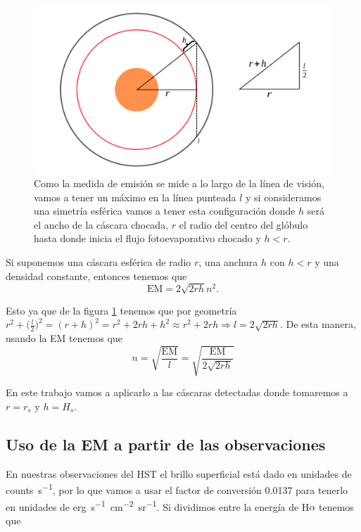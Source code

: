 \documentclass{book}
\begin{document}
\begin{figure}[htb]
    \centering    \includegraphics[width=\textwidth]{artesanales/ImgFi01-4.pdf}
    \caption{Como la medida de emisión se mide a lo largo de la línea de visión, vamos a tener un máximo en la línea punteada $l$ y si consideramos una simetría esférica vamos a tener esta configuración donde $h$ será el ancho de la cáscara chocada, $r$ el radio del centro del glóbulo hasta donde inicia el flujo fotoevaporativo chocado y $h<r$.}
    \label{fig:EM}
\end{figure}

Si suponemos una cáscara esférica de radio $r$, una anchura $h$ con  $h<r$ y una densidad constante, entonces tenemos que
\begin{equation}
\mathrm{EM}=2\sqrt{2rh}n^2.\end{equation}

Esto ya que de la figura \ref{fig:EM} tenemos que por geometría $r^2+\Big(\frac{l}{2}\Big)^2=(r+h)^2=r^2+2rh+h^2\approx r^2+2rh\Rightarrow l=2\sqrt{2rh}$. De esta manera, usando la EM tenemos que \begin{equation}n=\sqrt{\frac{\mathrm{EM}}{l}}=\sqrt{\frac{\mathrm{EM}}{2\sqrt{2rh}}}
\end{equation} 

En este trabajo vamos a aplicarlo a las cáscaras detectadas donde tomaremos a $r=r_s$ y $h=H_s$.

\subsection{Uso de la EM a partir de las observaciones} \label{Subsec : EM}

En nuestras observaciones del HST el brillo superficial está dado en unidades de \unit{counts.s^{-1}}, por lo que vamos a usar el factor de conversión 0.0137 para tenerlo en unidades de \unit{erg.s^{-1}.cm^{-2}.sr^{-1}}. Si dividimos entre la energía de H$\alpha$ tenemos que
\end{document}
